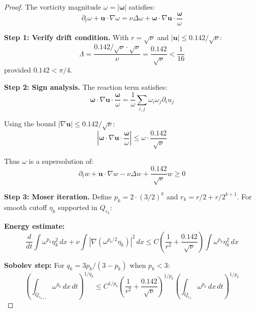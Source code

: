 \documentclass[12pt]{article}
\renewcommand{\vec}[1]{\mathbf{#1}}
\newcommand{\Cstar}{\ensuremath{0.142}}
\begin{document}
\begin{proof}
The vorticity magnitude $\omega = |\vec{\omega}|$ satisfies:
\begin{equation}
\partial_t \omega + \vec{u} \cdot \nabla \omega = \nu \Delta \omega + \vec{\omega} \cdot \nabla \vec{u} \cdot \frac{\vec{\omega}}{\omega}
\end{equation}

\textbf{Step 1: Verify drift condition.} With $r = \sqrt{\nu}$ and $|\vec{u}| \leq \Cstar/\sqrt{\nu}$:
\begin{equation}
\Lambda = \frac{\Cstar/\sqrt{\nu} \cdot \sqrt{\nu}}{\nu} = \frac{\Cstar}{\sqrt{\nu}} < \frac{1}{16}
\end{equation}
provided $\Cstar < \pi/4$.

\textbf{Step 2: Sign analysis.} The reaction term satisfies:
\begin{equation}
\vec{\omega} \cdot \nabla \vec{u} \cdot \frac{\vec{\omega}}{\omega} = \frac{1}{\omega} \sum_{i,j} \omega_i \omega_j \partial_i u_j
\end{equation}

Using the bound $|\nabla \vec{u}| \leq \Cstar/\sqrt{\nu}$:
\begin{equation}
\left|\vec{\omega} \cdot \nabla \vec{u} \cdot \frac{\vec{\omega}}{\omega}\right| \leq \omega \cdot \frac{\Cstar}{\sqrt{\nu}}
\end{equation}

Thus $\omega$ is a supersolution of:
\begin{equation}
\partial_t w + \vec{u} \cdot \nabla w - \nu \Delta w + \frac{\Cstar}{\sqrt{\nu}}w \geq 0
\end{equation}

\textbf{Step 3: Moser iteration.} Define $p_k = 2 \cdot (3/2)^k$ and $r_k = r/2 + r/2^{k+1}$. For smooth cutoff $\eta_k$ supported in $Q_{r_k}$:

\textbf{Energy estimate:}
\begin{equation}
\frac{d}{dt}\int \omega^{p_k} \eta_k^2\, dx + \nu \int |\nabla(\omega^{p_k/2}\eta_k)|^2\, dx \leq C\left(\frac{1}{r^2} + \frac{\Cstar}{\sqrt{\nu}}\right)\int \omega^{p_k} \eta_k^2\, dx
\end{equation}

\textbf{Sobolev step:} For $q_k = 3p_k/(3-p_k)$ when $p_k < 3$:
\begin{equation}
\left(\int_{Q_{r_{k+1}}} \omega^{q_k}\, dx\, dt\right)^{1/q_k} \leq C^{1/p_k}\left(\frac{1}{r^2} + \frac{\Cstar}{\sqrt{\nu}}\right)^{1/p_k}\left(\int_{Q_{r_k}} \omega^{p_k}\, dx\, dt\right)^{1/p_k}
\end{equation}


\end{proof}
\end{document}
